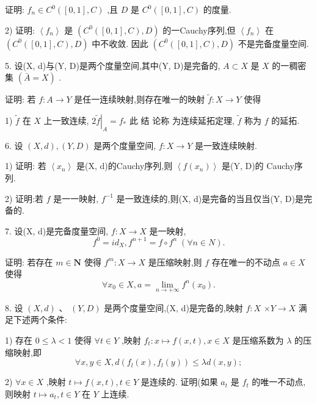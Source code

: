 证明: ${f}_{n} \in  {C}^{0}\left( {\left\lbrack  {0,1}\right\rbrack  ,C}\right)$ ,且 $D$ 是 ${C}^{0}\left( {\left\lbrack  {0,1}\right\rbrack  ,C}\right)$ 的度量.

2) 证明: $\left\langle  {f}_{n}\right\rangle$ 是 $\left( {{C}^{0}\left( {\left\lbrack  {0,1}\right\rbrack  ,C}\right) ,D}\right)$ 的一Cauchy序列,但 $\left\langle  {f}_{n}\right\rangle$ 在 $\left( {{C}^{0}\left( {\left\lbrack  {0,1}\right\rbrack  ,C}\right) ,D}\right)$ 中不收敛. 因此 $\left( {{C}^{0}\left( {\left\lbrack  {0,1}\right\rbrack  ,C}\right) ,D}\right)$ 不是完备度量空间.

5. 设(X, d)与(Y, D)是两个度量空间,其中(Y, D)是完备的, $A \subset  X$ 是 $X$ 的一稠密集 $\left( {\bar{A} = X}\right)$ .

证明: 若 $f : A \rightarrow  Y$ 是任一连续映射,则存在唯一的映射 $\widetilde{f} : X \rightarrow  Y$ 使得

1) $\widetilde{f}$ 在 $X$ 上一致连续, $2{\left. \widetilde{f}\right| }_{A} = {f}_{ * }$ 此 结 论称 为连续延拓定理, $\widetilde{f}$ 称为 $f$ 的延拓.

6. 设 $\left( {X,d}\right) ,\left( {Y,D}\right)$ 是两个度量空间, $f : X \rightarrow  Y$ 是一致连续映射.

1) 证明: 若 $\left\langle  {x}_{n}\right\rangle$ 是(X, d)的Cauchy序列,则 $\left\langle  {f\left( {x}_{n}\right) }\right\rangle$ 是(Y, D)的 Cauchy序列.

2) 证明:若 $f$ 是一一映射, ${f}^{-1}$ 是一致连续的,则(X, d)是完备的当且仅当(Y, D)是完备的.

7. 设(X, d)是完备度量空间, $f : X \rightarrow  X$ 是一映射,
$${f}^{0} = i{d}_{X},{f}^{n + 1} = f \circ  {f}^{n}\;\left( {\forall n \in  N}\right) .$$

证明: 若存在 $m \in  \mathbf{N}$ 使得 ${f}^{m} : X \rightarrow  X$ 是压缩映射,则 $f$ 存在唯一的不动点 $a \in  X$ 使得
$$\forall {x}_{0} \in  X,a = \mathop{\lim }\limits_{{n \rightarrow   + \infty }}{f}^{n}\left( {x}_{0}\right) .$$

8. 设 $\left( {X,d}\right) \text{ 、 }\left( {Y,D}\right)$ 是两个度量空间,(X, d)是完备的,映射 $f : X$  $\times  Y \rightarrow  X$ 满足下述两个条件:

1) 存在 $0 \leq  \lambda  < 1$ 使得 $\forall t \in  Y$ ,映射 ${f}_{t} : x \mapsto  f\left( {x,t}\right) ,x \in  X$ 是压缩系数为 $\lambda$ 的压缩映射,即
$$\forall x,y \in  X,d\left( {{f}_{l}\left( x\right) ,{f}_{l}\left( y\right) }\right)  \leq  {\lambda d}\left( {x,y}\right) ;$$

2) $\forall x \in  X$ ,映射 $t \mapsto  f\left( {x,t}\right) ,t \in  Y$ 是连续的. 证明(如果 ${a}_{t}$ 是 ${f}_{t}$ 的唯一不动点,则映射 $t \mapsto  {a}_{t},t \in  Y$ 在 $Y$ 上连续.

